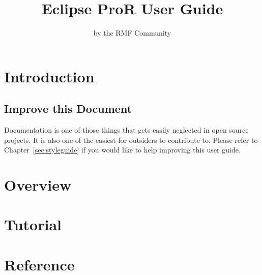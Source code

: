 \documentclass[twoside,10pt]{book}
\title{Eclipse ProR User Guide}
\author{by the RMF Community}
\begin{document}
        

\maketitle

\tableofcontents

\chapter{Introduction}





\section{Improve this Document}
Documentation is one of those things that gets easily neglected in open source projects.
It is also one of the easiest for outsiders to contribute to.  Please refer to
Chapter~\ref{sec:styleguide} if you would like to help improving this user guide.




\chapter{Overview}
\label{sec:overview}


\chapter{Tutorial}
\label{sec:tutorial}


\chapter{Reference}

\end{document}
